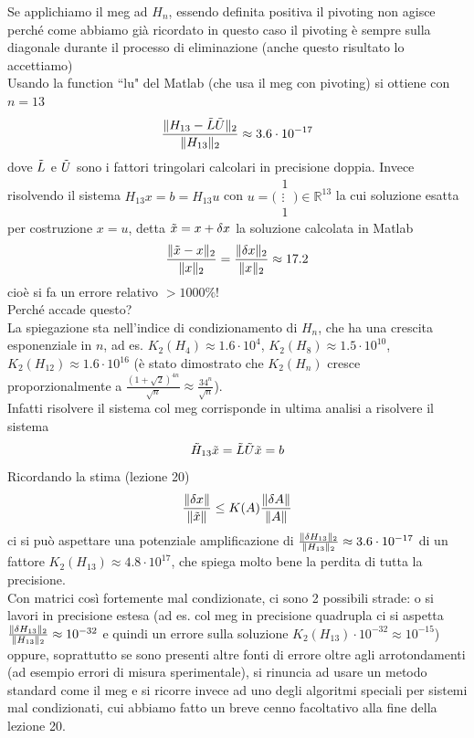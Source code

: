 Se applichiamo il meg ad $H_n$, essendo definita positiva il pivoting non agisce perché come abbiamo già ricordato in questo caso il pivoting è sempre sulla diagonale durante il processo di eliminazione (anche questo risultato lo accettiamo) \\
Usando la function ``lu" del Matlab (che usa il meg con pivoting) si ottiene con $n=13$
\begin{equation*}
    \frac{\lVert H_{13}-\Tilde{L}\Tilde{U}\rVert_2}{\lVert H_{13}\rVert_2} \approx 3.6\cdot 10^{-17}
\end{equation*}
dove $\Tilde{L}$ e $\Tilde{U}$ sono i fattori tringolari calcolari in precisione doppia. Invece risolvendo il sistema $H_{13}x=b=H_{13}u$ con $u=\biggl(\begin{smallmatrix} 1 \\ \vdots \\ 1 \end{smallmatrix}\biggr) \in \mathbb{R}^{13}$ la cui soluzione esatta per costruzione $x=u$, detta $\Tilde{x}=x+\delta x$ la soluzione calcolata in Matlab
\begin{equation*}
    \frac{\lVert\Tilde{x}-x\rVert_2}{\lVert x\rVert_2}=\frac{\lVert\delta x\rVert_2}{\lVert x\rVert_2} \approx 17.2
\end{equation*}
cioè si fa un errore relativo $>1000\%$! \\
Perché accade questo?\\
La spiegazione sta nell'indice di condizionamento di $H_n$, che ha una crescita esponenziale in $n$, ad es. $K_2(H_4)\approx 1.6 \cdot 10^4$, $K_2(H_8) \approx 1.5\cdot 10^{10}$, $K_2(H_{12}) \approx 1.6 \cdot 10^{16}$ (è stato dimostrato che $K_2(H_n)$ cresce proporzionalmente a $\frac{(1+\sqrt{2})^{4n}}{\sqrt{n}} \approx \frac{34^n}{\sqrt{n}}$). \\
Infatti risolvere il sistema col meg corrisponde in ultima analisi a risolvere il sistema
\begin{equation*}
    \Tilde{H}_{13}\Tilde{x} = \Tilde{L}\Tilde{U}\Tilde{x}=b
\end{equation*}
Ricordando la stima (lezione 20)
\begin{equation*}
    \frac{\lVert\delta x\rVert}{\lVert\Tilde{x}\rVert} \leq K(A) \frac{\lVert\delta A\rVert}{\lVert A\rVert}
\end{equation*}
ci si può aspettare una potenziale amplificazione di $\frac{\lVert\delta H_{13}\rVert_2}{\lVert H_{13}\rVert_2} \approx 3.6 \cdot 10^{-17}$ di un fattore $K_2(H_{13}) \approx 4.8 \cdot 10^{17}$, che spiega molto bene la perdita di tutta la precisione. \\Con matrici così fortemente mal condizionate, ci sono 2 possibili strade: o si lavori in precisione estesa (ad es. col meg in precisione quadrupla ci si aspetta $\frac{\lVert\delta H_{13}\rVert_2}{\lVert H_{13}\rVert_2} \approx  10^{-32}$ e quindi un errore sulla soluzione $K_2(H_{13}) \cdot 10^{-32} \approx 10^{-15}$) oppure, soprattutto se sono presenti altre fonti di errore oltre agli arrotondamenti (ad esempio errori di misura sperimentale), si rinuncia ad usare un metodo standard come il meg e si ricorre invece ad uno degli algoritmi speciali per sistemi mal condizionati, cui abbiamo fatto un breve cenno facoltativo alla fine della lezione 20.
\newpage